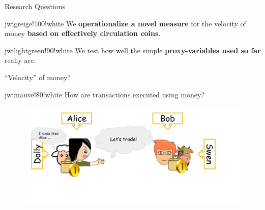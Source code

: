 \begin{frame}{Research Questions}	
	\begin{alertblockc}{}{jwigreige!100!white}%
		We \textbf{operationalize a novel measure} for the velocity of money \textbf{based on effectively circulation coins}.%
	\end{alertblockc}
	\begin{alertblockc}{}{jwilightgreen!90!white}%
		We test how well the simple \textbf{proxy-variables used so far} really are.%
	\end{alertblockc}
\end{frame}

\begin{frame}{``Velocity'' of money?}
	\vspace{1ex}
	\begin{alertblockc}[N]{}{jwimauve!80!white}%
		How are transactions executed using money?
	\end{alertblockc}
  \begin{figure}
    \centerline{\includegraphics[scale=0.17]{./pics/used/sheep_example_intro_HR(2)}}
  \end{figure}
\end{frame}

